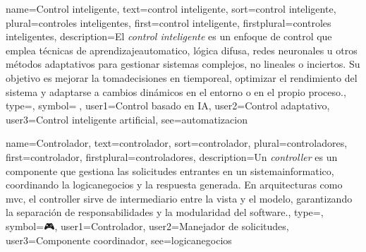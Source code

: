 	{
		name={Control inteligente},
		text={control inteligente},
		sort={control inteligente},
		plural={controles inteligentes},
		first={control inteligente},
		firstplural={controles inteligentes},
		description={El \emph{control inteligente} es un enfoque de control que emplea t{\'e}cnicas de \gls{aprendizajeautomatico}, l{\'o}gica difusa, redes neuronales u otros m{\'e}todos adaptativos para gestionar sistemas complejos, no lineales o inciertos. Su objetivo es mejorar la \gls{tomadecisiones} en \gls{tiemporeal}, optimizar el \gls{rendimiento} del \gls{sistema} y adaptarse a cambios din{\'a}micos en el \gls{entorno} o en el propio proceso.},
		type=\glsdefaulttype,
		symbol={🤖},
		user1={Control basado en IA},
		user2={Control adaptativo},
		user3={Control inteligente artificial},
		see={automatizacion}
	}
	
	{
		name={Controlador},
		text={controlador},
		sort={controlador},
		plural={controladores},
		first={controlador},
		firstplural={controladores},
		description={Un \emph{controller} es un componente que gestiona las solicitudes entrantes en un \gls{sistemainformatico}, coordinando la \gls{logicanegocios} y la respuesta generada. En arquitecturas como \gls{mvc}, el controller sirve de intermediario entre la vista y el modelo, garantizando la separaci{\'o}n de responsabilidades y la \gls{modularidad} del \gls{software}.},
		type=\glsdefaulttype,
		symbol={🎮},
		user1={Controlador},
		user2={Manejador de solicitudes},
		user3={Componente coordinador},
		see={logicanegocios}
	}
	
	
